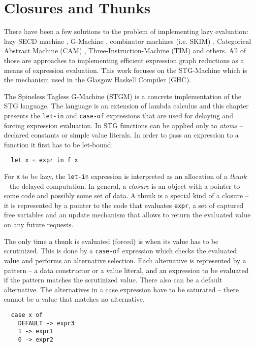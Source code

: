 \documentclass[en]{pracamgr}
\begin{document}
\section{Closures and Thunks}\label{s:closures}

There have been a few solutions to the problem of implementing lazy evaluation:
lazy SECD machine \cite{SECDM}, G-Machine \cite{G-Machine}, 
combinator machines (i.e. SKIM) \cite{combinators},
Categorical Abstract Machine (CAM) \cite{CAM}, 
Three-Instruction-Machine (TIM) \cite{TIM} and others.
All of those are approaches to implementing efficient expression graph reductions
as a means of expression evaluation.
This work focuses on the STG-Machine \cite{STGM} which is the mechanism used
in the Glasgow Haskell Compiler (GHC).

The Spineless Tagless G-Machine (STGM) is a concrete implementation of the STG language.
The language is an extension of lambda calculus and this chapter presents
the \texttt{let-in} and \texttt{case-of} expressions that are
used for delaying and forcing expression evaluation.
In STG functions can be applied only to \textit{atoms} -- declared constants or simple
value literals. In order to pass an expression to a function it first has to be
let-bound:

\begin{verbatim}
  let x = expr in f x
\end{verbatim}

For \texttt{x} to be lazy, the \texttt{let-in} expression is interpreted as an
allocation of a \textit{thunk} -- the delayed computation. 
In general, a \textit{closure} is an object with a pointer
to some code and possibly some set of data.
A thunk is a special kind of a closure -- it is represented
by a pointer to the code that evaluates \texttt{expr}, a set of captured
free variables and an update mechanism that allows to return the
evaluated value on any future requests.

The only time a thunk is evaluated (forced) is when its value has to be scrutinized.
This is done by a \texttt{case-of} expression which checks the evaluated value
and performs an alternative selection. Each alternative is represented by a
pattern -- a data constructor or a value literal, and an expression to be evaluated
if the pattern matches the scrutinized value. There also can be a default alternative.
The alternatives in a case expression have to be saturated -- there cannot be a value
that matches no alternative.

\begin{verbatim}
  case x of
    DEFAULT -> expr3
    1 -> expr1
    0 -> expr2
\end{verbatim}
\end{document}
